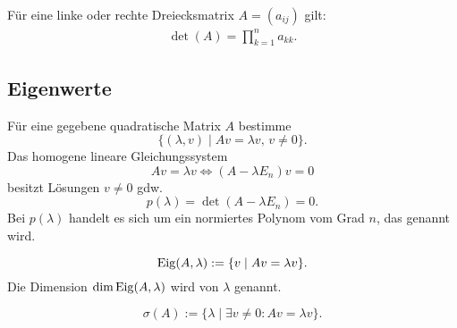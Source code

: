 Für eine linke oder rechte Dreiecksmatrix $A=(a_{ij})$ gilt:
\begin{gather}
\det(A) = \prod_{k=1}^n a_{kk}.
\end{gather}

\subsection{Eigenwerte}
Für eine gegebene quadratische Matrix $A$ bestimme
\begin{equation}
\{(\lambda,v)\mid Av = \lambda v,\,v\ne 0\}.
\end{equation}
Das homogene lineare Gleichungssystem
\begin{equation}
Av=\lambda v \iff (A-\lambda E_n)v=0
\end{equation}
besitzt Lösungen $v\ne 0$ gdw.
\begin{equation}
p(\lambda)=\det(A-\lambda E_n)=0.
\end{equation}
Bei $p(\lambda)$ handelt es sich um ein normiertes Polynom
vom Grad $n$, das 
genannt wird.

\begin{equation}
\operatorname*{Eig}(A,\lambda):=\{v\mid Av=\lambda v\}.
\end{equation}
Die Dimension $\dim\operatorname*{Eig}(A,\lambda)$ wird
von $\lambda$ genannt.

\begin{equation}
\sigma(A) := \{\lambda\mid \exists v\ne 0\colon Av=\lambda v\}.
\end{equation}

